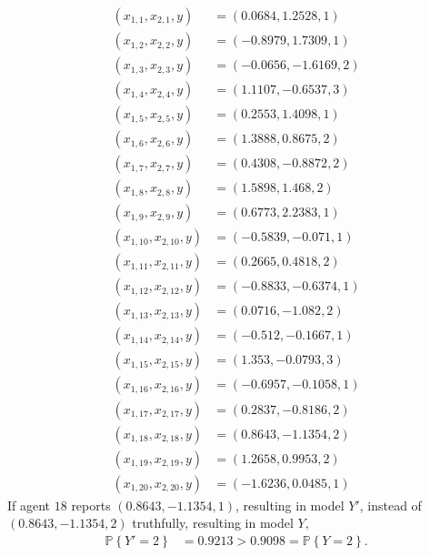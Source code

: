\documentclass{article}
\begin{document}
\begin{align*}
\left(x_{1,1}, x_{2,1}, y\right) &= \left(0.0684, 1.2528, 1\right)
\\ \left(x_{1,2}, x_{2,2}, y\right) &= \left(-0.8979, 1.7309, 1\right)
\\ \left(x_{1,3}, x_{2,3}, y\right) &= \left(-0.0656, -1.6169, 2\right)
\\ \left(x_{1,4}, x_{2,4}, y\right) &= \left(1.1107, -0.6537, 3\right)
\\ \left(x_{1,5}, x_{2,5}, y\right) &= \left(0.2553, 1.4098, 1\right)
\\ \left(x_{1,6}, x_{2,6}, y\right) &= \left(1.3888, 0.8675, 2\right)
\\ \left(x_{1,7}, x_{2,7}, y\right) &= \left(0.4308, -0.8872, 2\right)
\\ \left(x_{1,8}, x_{2,8}, y\right) &= \left(1.5898, 1.468, 2\right)
\\ \left(x_{1,9}, x_{2,9}, y\right) &= \left(0.6773, 2.2383, 1\right)
\\ \left(x_{1,10}, x_{2,10}, y\right) &= \left(-0.5839, -0.071, 1\right)
\\ \left(x_{1,11}, x_{2,11}, y\right) &= \left(0.2665, 0.4818, 2\right)
\\ \left(x_{1,12}, x_{2,12}, y\right) &= \left(-0.8833, -0.6374, 1\right)
\\ \left(x_{1,13}, x_{2,13}, y\right) &= \left(0.0716, -1.082, 2\right)
\\ \left(x_{1,14}, x_{2,14}, y\right) &= \left(-0.512, -0.1667, 1\right)
\\ \left(x_{1,15}, x_{2,15}, y\right) &= \left(1.353, -0.0793, 3\right)
\\ \left(x_{1,16}, x_{2,16}, y\right) &= \left(-0.6957, -0.1058, 1\right)
\\ \left(x_{1,17}, x_{2,17}, y\right) &= \left(0.2837, -0.8186, 2\right)
\\ \left(x_{1,18}, x_{2,18}, y\right) &= \left(0.8643, -1.1354, 2\right)
\\ \left(x_{1,19}, x_{2,19}, y\right) &= \left(1.2658, 0.9953, 2\right)
\\ \left(x_{1,20}, x_{2,20}, y\right) &= \left(-1.6236, 0.0485, 1\right)
\end{align*}
If agent $18$ reports $\left(0.8643, -1.1354, 1\right)$, resulting in model $Y'$, instead of $\left(0.8643, -1.1354, 2\right)$ truthfully, resulting in model $Y, $
\begin{align*}
\mathbb{P}\left\{Y' = 2\right\} &= 0.9213 > 0.9098 = \mathbb{P}\left\{Y = 2\right\}.
\end{align*}
\end{document}
